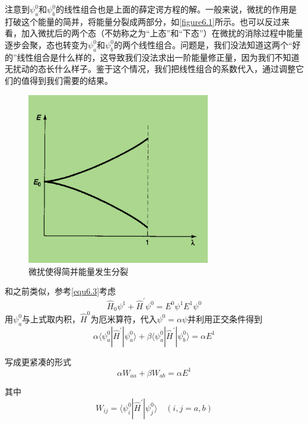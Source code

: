 \documentclass[UTF8]{ctexart}
\begin{document}
\noindent 注意到$\psi_a^0$和$\psi_b^0$的线性组合也是上面的薛定谔方程的解。一般来说，微扰的作用是打破这个能量的简并，将能量分裂成两部分，如\autoref{figure6.1}所示。也可以反过来看，加入微扰后的两个态（不妨称之为“上态”和“下态”）在微扰的消除过程中能量逐步会聚，态也转变为$\psi_a^0$和$\psi_b^0$的两个线性组合。问题是，我们没法知道这两个“好的”线性组合是什么样的，这导致我们没法求出一阶能量修正量，因为我们不知道无扰动的态长什么样子。鉴于这个情况，我们把线性组合的系数代入，通过调整它们的值得到我们需要的结果。
\begin{figure}[htb]
    \centering
    \includegraphics[width=8cm]{figure6-1.png}
    \caption{微扰使得简并能量发生分裂}
    \label{figure6.1}
\end{figure}

    和之前类似，参考\autoref{equ6.3}考虑
    \begin{equation}
        \hat{H}_0 \psi^1 + \hat{H}^{\prime} \psi^0 = E^0 \psi^1 E^1 \psi^0
    \end{equation}
\noindent 用$\psi_a^0$与上式取内积，$\hat{H}^0$为厄米算符，代入$\psi^0 = \alpha \psi$并利用正交条件得到
\begin{equation}
    \alpha \langle \psi_a^0 | \hat{H}^{\prime} | \psi_a^0 \rangle + \beta \langle \psi_a^0 | \hat{H}^{\prime} | \psi_b^0 \rangle = \alpha E^1  
\end{equation}

\noindent 写成更紧凑的形式
\begin{equation}
    \alpha W_{aa} + \beta W_{ab} = \alpha E^1 \label{equ6.7}
\end{equation}

\noindent 其中
\begin{equation}
    W_{ij} = \langle \psi_i^0 | \hat{H}^{\prime} | \psi_j^0 \rangle \quad (i,j=a,b)
\end{equation}
\end{document}
